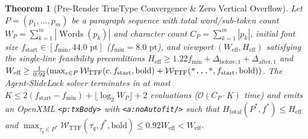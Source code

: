 \documentclass[10pt,journal,compsoc]{IEEEtran}
\newtheorem{theorem}{Theorem}
\begin{document}
\begin{theorem}[Pre-Render TrueType Convergence \& Zero Vertical Overflow]
\label{thm:truetype}
Let $P = (p_1, \dots, p_m)$ be a paragraph sequence with total word/sub-token count $W_P = \sum_{k=1}^m |\operatorname{Words}(p_k)|$ and character count $C_P = \sum_{k=1}^m |p_k|$, initial font size $f_{\text{start}} \in [f_{\min}, 44.0\text{ pt}]$ ($f_{\min} = 8.0\text{ pt}$), and viewport $(W_{\text{eff}}, H_{\text{eff}})$ satisfying the single-line feasibility preconditions $H_{\text{eff}} \ge 1.22 f_{\min} + \Delta_{\text{before},1} + \Delta_{\text{after},1}$ and $W_{\text{eff}} \ge \frac{1}{0.92}(\max_{c \in P} \mathcal{W}_{\text{TTF}}(c, f_{\text{start}}, \text{bold}) + \mathcal{W}_{\text{TTF}}(\text{\texttt{"..."}}, f_{\text{start}}, \text{bold}))$. The Agent-SlideLock solver terminates in at most $K \le 2(f_{\text{start}} - f_{\min}) + \lfloor \log_2 W_P \rfloor + 2$ evaluations ($\mathcal{O}(C_P \cdot K)$ time) and emits an OpenXML \texttt{<p:txBody>} with \texttt{<a:noAutofit/>} such that $H_{\text{total}}(P^*, f^*) \le H_{\text{eff}}$ and $\max_{\tau_q \in P^*} \mathcal{W}_{\text{TTF}}(\tau_q, f^*, \text{bold}) \le 0.92 W_{\text{eff}} < W_{\text{eff}}$.
\end{theorem}
\end{document}
